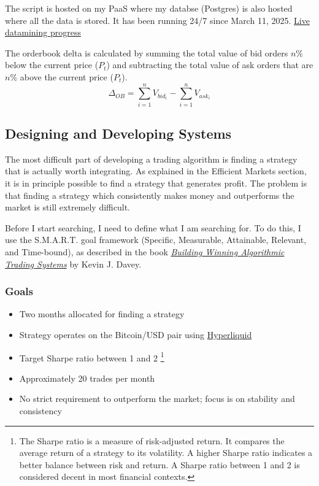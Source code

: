 \documentclass[12pt]{article}
\begin{document}
The script is hosted on my PaaS where my databse (Postgres) is also hosted where all the data is stored. It has been running 24/7 since March 11, 2025. 
\href{https://customchart-production.up.railway.app/#}{Live datamining progress}

The orderbook delta is calculated by summing the total value of bid orders $n\%$ below the current price ($P_t$) and subtracting the total value of ask orders that are $n\%$ above the current price ($P_t$).
\begin{equation*}
    \Delta_{OB} = \sum_{i=1}^{n} V_{bid_i} - \sum_{i=1}^{n} V_{ask_i}    
\end{equation*}




\newpage
\subsection{Designing and Developing Systems}


The most difficult part of developing a trading algorithm is finding a strategy that is actually worth integrating. As explained in the Efficient Markets section, it is in principle possible to find a strategy that generates profit. The problem is that finding a strategy which consistently makes money and outperforms the market is still extremely difficult.

Before I start searching, I need to define what I am searching for. To do this, I use the S.M.A.R.T. goal framework (Specific, Measurable, Attainable, Relevant, and Time-bound), as described in the book \href{https://www.amazon.com/Building-Winning-Algorithmic-Trading-Systems/dp/1118778987}{\textit{Building Winning Algorithmic Trading Systems}} by Kevin J. Davey.

\subsubsection*{Goals}
\begin{itemize}
    \item Two months allocated for finding a strategy
    \item Strategy operates on the Bitcoin/USD pair using \href{https://hyperfoundation.org/}{Hyperliquid}
    \item Target Sharpe ratio between 1 and 2 \footnote{The Sharpe ratio is a measure of risk-adjusted return. It compares the average return of a strategy to its volatility. A higher Sharpe ratio indicates a better balance between risk and return. A Sharpe ratio between 1 and 2 is considered decent in most financial contexts.}
    \item Approximately 20 trades per month
    \item No strict requirement to outperform the market; focus is on stability and consistency
\end{itemize}
\end{document}
